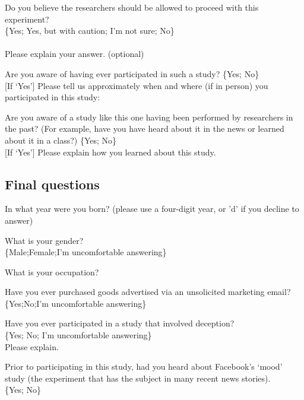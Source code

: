 \noindent
Do you believe the researchers should be allowed to proceed with this experiment?
\\
\{Yes; Yes, but with caution; I'm not sure; No\}
\\
\\
Please explain your answer. (optional)

\noindent
Are you aware of having ever participated in such a study?
\{Yes;  No\}
\\
{[}If `Yes'{]}
Please tell us approximately when and where (if in person) you participated in this study:

\noindent
Are you aware of a study like this one having been performed by researchers in the past? (For example, have you have heard about it in the news or learned about it in a class?)
\{Yes;  No\}
\\
{[}If `Yes'{]} Please explain how you learned about this study.

\subsection{Final questions}

\noindent
In what year were you born? (please use a four-digit year, or 'd' if you decline to answer)

\noindent
What is your gender?
\\
\{Male;Female;I'm uncomfortable answering\}

\noindent
What is your occupation?

\noindent
Have you ever purchased goods advertised via an unsolicited marketing email?
\\
\{Yes;No;I'm uncomfortable answering\}

\noindent
Have you ever participated in a study that involved deception?
\\
\{Yes; No; I'm uncomfortable answering\}
\\
Please explain.

\noindent
Prior to participating in this study, had you heard about Facebook's ‘mood’ study (the experiment that has the subject in many recent news stories).
\\
\{Yes; No\}